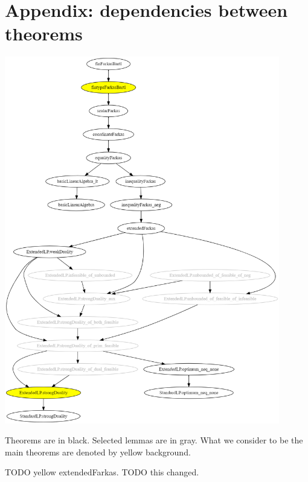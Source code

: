 \documentclass[]{article}
\renewcommand{\.}{\hskip .75pt}
\begin{document}
%

\section{Appendix: dependencies between theorems}

\includegraphics[width=0.9\textwidth]{theorems.png}

Theorems are in black. Selected lemmas are in gray.
What we consider to be the main theorems are
denoted by yellow background.

TODO yellow extendedFarkas.
{\color{blue} TODO this changed.}
\end{document}
